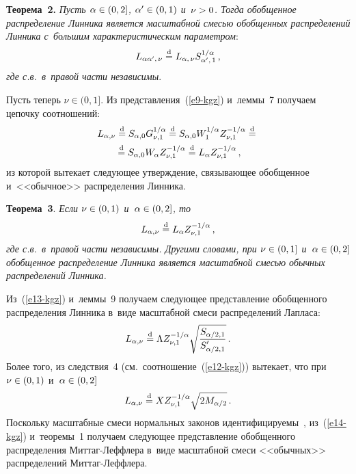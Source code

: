 \begin{multicols}{2}
\smallskip

\noindent
\textbf{Теорема~2.} \textit{Пусть $\alpha\hm\in(0,2]$, $\alpha'\hm\in(0,1)$ 
и~$\nu\hm>0$. Тогда обобщенное распределение Линника является масштабной
смесью обобщенных распределений Линника с~б$\acute{\mbox{о}}$льшим
характеристическим параметром}: 
$$
L_{\alpha\alpha',\,\nu}\stackrel{\mathrm{d}}{=}
L_{\alpha,\,\nu} S_{\alpha',\,1}^{1/\alpha}\,,
$$
 \textit{где с.в.\ 
в~правой части независимы}.

\smallskip

Пусть теперь $\nu\in(0,1]$. Из представления~(\ref{e9-kgz}) и~леммы~7 получаем
цепочку соотношений:
\begin{multline*}
L_{\alpha,\nu}\stackrel{\mathrm{d}}{=} S_{\alpha,0} G_{\nu,1}^{1/\alpha}\stackrel{\mathrm{d}}{=}
S_{\alpha,0} W_1^{1/\alpha} Z_{\nu,1}^{-1/\alpha}\stackrel{\mathrm{d}}{=}{}\\
{}\stackrel{\mathrm{d}}{=}
S_{\alpha,0} W_{\alpha} Z_{\nu,1}^{-1/\alpha}\stackrel{\mathrm{d}}{=}
L_{\alpha} Z_{\nu,1}^{-1/\alpha}\,,
\end{multline*}
из которой вытекает следующее утверждение, связывающее обобщенное 
и~<<обычное>> распределения Линника.

\smallskip

\noindent
\textbf{Теорема~3}. \textit{Если $\nu\hm\in(0,1)$ и~$\alpha\hm\in(0,2]$, то}
\begin{equation}
L_{\alpha,\nu}\stackrel{\mathrm{d}}{=} L_{\alpha} Z_{\nu,1}^{-1/\alpha}\,,\label{e13-kgz}
\end{equation}
\textit{где с.в.\ в~правой части независимы. Другими словами, при
$\nu\hm\in(0,1]$ и~$\alpha\hm\in(0,2]$ обобщенное распределение Линника
является масштабной смесью обычных распределений Линника.}

\smallskip

Из~(\ref{e13-kgz}) и~леммы~9 получаем следующее пред\-став\-ле\-ние обобщенного
распределения Линника в~виде масштабной смеси распределений Лапласа:
$$
L_{\alpha,\nu}\stackrel{\mathrm{d}}{=} \Lambda
Z_{\nu,1}^{-1/\alpha}\sqrt{\displaystyle\frac{\displaystyle S_{\alpha/2,1}\mathstrut}{\displaystyle S'_{\alpha/2,1}\mathstrut}}\,.
$$
Более того, из следствия~4 (см.\ соотношение~(\ref{e12-kgz})) вытекает, что при
$\nu\hm\in(0,1)$ и~$\alpha\hm\in(0,2]$
\begin{equation}
L_{\alpha,\nu}\stackrel{\mathrm{d}}{=} X
Z_{\nu,1}^{-1/\alpha}\sqrt{2M_{\alpha/2}}\,.\label{e14-kgz}
\end{equation}
Поскольку масштабные смеси нормальных законов идентифицируемы~\cite{Teicher1961}, 
из~(\ref{e14-kgz}) и~теоремы~1 получаем следующее
представление обобщенного распределения Мит\-таг-Леф\-фле\-ра в~виде
масштабной смеси <<обычных>> распределений Мит\-таг-Леф\-флера.


\end{multicols}
